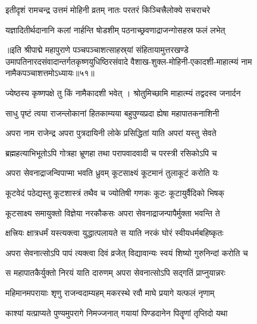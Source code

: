 \twolineshloka
{इतीदृशं रामचन्द्र उत्तमं मोहिनी व्रतम्}
{नातः परतरं किञ्चित्त्रैलोक्ये सचराचरे}%

\twolineshloka
{यज्ञादितीर्थदानानि कलां नार्हन्ति षोडशीम्}
{पठनाच्छ्रवणाद्राजन्गोसहस्र फलं लभेत्}%

॥इति श्रीपाद्मे महापुराणे पञ्चपञ्चाशत्साहस्र्यां संहितायामुत्तरखण्डे उमापतिनारदसंवादान्तर्गतकृष्णयुधिष्ठिरसंवादे वैशाख-शुक्ल-मोहिनी-एकादशी-माहात्म्यं नाम नामैकपञ्चाशत्तमोऽध्यायः॥५१॥


\hyperref[sec:ekadashi_mahatmyam_padma_puranam]{\closesub}
\clearpage

\label{sec:padma-jyeshtha-krishnapara}



\twolineshloka
{ज्येष्ठस्य कृष्णपक्षे तु किं नामैकादशी भवेत् 	।}
{श्रोतुमिच्छामि माहात्म्यं तद्वदस्व जनार्दन}%


\twolineshloka
{साधु पृष्टं त्वया राजन्लोकानां हितकाम्यया}
{बहुपुण्यप्रदा ह्येषा महापातकनाशिनी}%

\twolineshloka
{अपरा नाम राजेन्द्र अपरा पुत्रदायिनी}
{लोके प्रसिद्धितां याति अपरां यस्तु सेवते}%

\twolineshloka
{ब्रह्महत्याभिभूतोऽपि गोत्रहा भ्रूणहा तथा}
{परापवादवादी च परस्त्री रसिकोऽपि च}%

\twolineshloka
{अपरा सेवनाद्राजन्विपाप्मा भवति ध्रुवम्}
{कूटसाक्ष्यं कूटमानं तुलाकूटं करोति यः}%

\twolineshloka
{कूटवेदं पठेद्यस्तु कूटशास्त्रं तथैव च}
{ज्योतिषी गणकः कूटः कूटायुर्वैदिको भिषक्}%

\twolineshloka
{कूटसाक्ष्य समायुक्तो विज्ञेया नरकौकसः}
{अपरा सेवनाद्राजन्पापैर्मुक्ता भवन्ति ते}%

\twolineshloka
{क्षत्त्रियः क्षात्रधर्मं यस्त्यक्त्वा युद्धात्पलायते}
{स याति नरकं घोरं स्वीयधर्मबहिष्कृतः}%

\twolineshloka
{अपरा सेवनात्सोऽपि पापं त्यक्त्वा दिवं व्रजेत्}
{विद्यावान्यः स्वयं शिष्यो गुरुनिन्दां करोति च}%

\twolineshloka
{स महापातकैर्युक्तो निरयं याति दारुणम्}
{अपरा सेवनात्सोऽपि सद्गतिं प्राप्नुयान्नरः}%

\twolineshloka
{महिमानमपरायाः शृणु राजन्वदाम्यहम्}
{मकरस्थे रवौ माघे प्रयागे यत्फलं नृणाम्}%

\twolineshloka
{काश्यां यत्प्राप्यते पुण्यमुपरागे निमज्जनात्}
{गयायां पिण्डदानेन पितॄणां तृप्तिदो यथा}%

